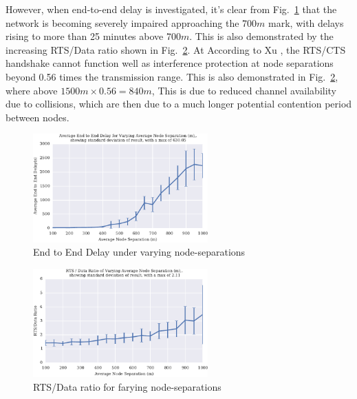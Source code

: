 \documentclass[runningheads,a4paper]{llncs}
\begin{document}
However, when end-to-end delay is investigated, it's clear from Fig.~\ref{fig:delay_range} that the network is becoming severely impaired approaching the 700$m$ mark, with delays rising to more than 25 minutes above 700$m$.
This is also demonstrated by the increasing RTS/Data ratio shown in Fig.~\ref{fig:rts_range}.
At 
According to Xu \cite{Xu2002}, the RTS/CTS handshake cannot function well as interference protection at node separations beyond 0.56 times the transmission range. 
This is also demonstrated in  Fig.~\ref{fig:rts_range}, where above $1500m \times 0.56 = 840m$, 
This is due to reduced channel availability due to collisions, which are then due to a much longer potential contention period between nodes. 

\begin{figure}[H]
  \centering
  \includegraphics[width=0.6\textwidth]{img/delay_range.pdf}
  \caption{End to End Delay under varying node-separations}
  \label{fig:delay_range}
\end{figure}

\begin{figure}[H]
  \centering
  \includegraphics[width=0.6\textwidth]{img/rts_range.pdf}
  \caption{RTS/Data ratio for farying node-separations}
  \label{fig:rts_range}
\end{figure}


\begin{table}[H]
  \caption{Tabular view of data from Figs~\ref{fig:prod_breakdown_range}, \ref{fig:delay_range}, and \ref{fig:rts_range}} \label{tab:rangedelay}
  \begin{center}
      
  \end{center}
\end{table}
\end{document}
